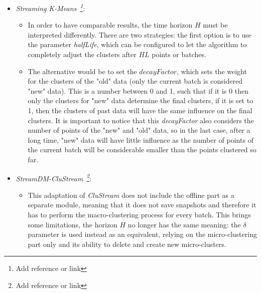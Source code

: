 
\color{red}
\begin{itemize}
 \item \textit{Streaming K-Means~\footnote{Add reference or link}}:
 \begin{itemize}
  \item In order to have comparable results, the time horizon $H$ must be interpreted differently. There are two strategies: the first option is to use the parameter \textit{halfLife}, which can be configured to let the algorithm to completely adjust the clusters after $HL$ points or batches.
  \item The alternative would be to set the $decayFactor$, which sets the weight for the clusters of the "old" data (only the current batch is considered "new" data). This is a number between 0 and 1, such that if it is 0 then only the clusters for "new" data determine the final clusters, if it is set to 1, then the clusters of past data will have the same influence on the final clusters. It is important to notice that this \textit{decayFactor} also considers the number of points of the "new" and "old" data, so in the last case, after a long time, "new" data will have little influence as the number of points of the current batch will be considerable smaller than the points clustered so far.
 \end{itemize}
 \item \textit{StreamDM-CluStream~\footnote{Add reference or link}}:
 \begin{itemize}
  \item This adaptation of \textit{CluStream} does not include the offline part as a separate module, meaning that it does not save snapshots and therefore it has to perform the macro-clustering process for every batch. This brings some limitations, the horizon $H$ no longer has the same meaning: the $\delta$ parameter is used instead as an equivalent, relying on the micro-clustering part only and its ability to delete and create new micro-clusters.
\end{itemize}
\end{itemize}
\color{black}

